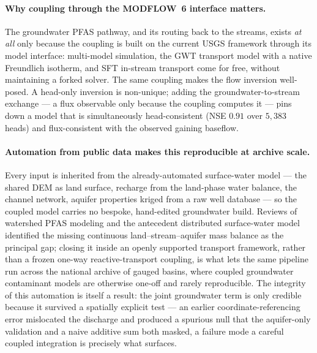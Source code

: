 \paragraph{Why coupling through the MODFLOW~6 interface matters.} The groundwater PFAS pathway, and
its routing back to the streams, exists \emph{at all} only because the coupling is built on the
current USGS framework through its model interface: multi-model simulation, the GWT transport model
with a native Freundlich isotherm, and SFT in-stream transport come for free, without maintaining a
forked solver. The same coupling makes the flow inversion well-posed. A head-only inversion is
non-unique; adding the groundwater-to-stream exchange --- a flux observable only because the coupling
computes it --- pins down a model that is simultaneously head-consistent (NSE $0.91$ over $5{,}383$
heads) and flux-consistent with the observed gaining baseflow.

\paragraph{Automation from public data makes this reproducible at archive scale.} Every input is
inherited from the already-automated surface-water model --- the shared DEM as land surface, recharge
from the land-phase water balance, the channel network, aquifer properties kriged from a raw well
database --- so the coupled model carries no bespoke, hand-edited groundwater build. Reviews of
watershed PFAS modeling and the antecedent distributed surface-water model \citep{rafiei2023pfas}
identified the missing continuous land--stream--aquifer mass balance as the principal gap; closing it
inside an openly supported transport framework, rather than a frozen one-way reactive-transport
coupling, is what lets the same pipeline run across the national archive of gauged basins, where
coupled groundwater contaminant models are otherwise one-off and rarely reproducible. The integrity of
this automation is itself a result: the joint groundwater term is only credible because it survived a
spatially explicit test --- an earlier coordinate-referencing error mislocated the discharge and
produced a spurious null that the aquifer-only validation and a naive additive sum both masked, a
failure mode a careful coupled integration is precisely what surfaces.

